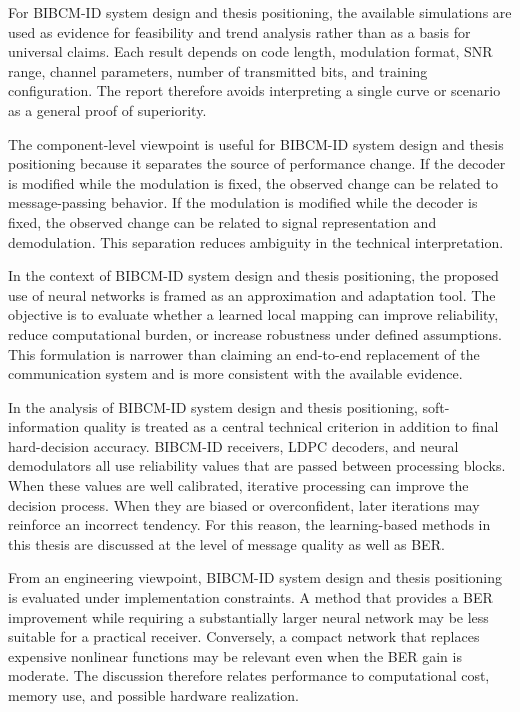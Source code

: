 For BIBCM-ID system design and thesis positioning, the available simulations are used as evidence for feasibility and trend analysis rather than as a basis for universal claims. Each result depends on code length, modulation format, SNR range, channel parameters, number of transmitted bits, and training configuration. The report therefore avoids interpreting a single curve or scenario as a general proof of superiority.

The component-level viewpoint is useful for BIBCM-ID system design and thesis positioning because it separates the source of performance change. If the decoder is modified while the modulation is fixed, the observed change can be related to message-passing behavior. If the modulation is modified while the decoder is fixed, the observed change can be related to signal representation and demodulation. This separation reduces ambiguity in the technical interpretation.

In the context of BIBCM-ID system design and thesis positioning, the proposed use of neural networks is framed as an approximation and adaptation tool. The objective is to evaluate whether a learned local mapping can improve reliability, reduce computational burden, or increase robustness under defined assumptions. This formulation is narrower than claiming an end-to-end replacement of the communication system and is more consistent with the available evidence.

In the analysis of BIBCM-ID system design and thesis positioning, soft-information quality is treated as a central technical criterion in addition to final hard-decision accuracy. BIBCM-ID receivers, LDPC decoders, and neural demodulators all use reliability values that are passed between processing blocks. When these values are well calibrated, iterative processing can improve the decision process. When they are biased or overconfident, later iterations may reinforce an incorrect tendency. For this reason, the learning-based methods in this thesis are discussed at the level of message quality as well as BER.

From an engineering viewpoint, BIBCM-ID system design and thesis positioning is evaluated under implementation constraints. A method that provides a BER improvement while requiring a substantially larger neural network may be less suitable for a practical receiver. Conversely, a compact network that replaces expensive nonlinear functions may be relevant even when the BER gain is moderate. The discussion therefore relates performance to computational cost, memory use, and possible hardware realization.

